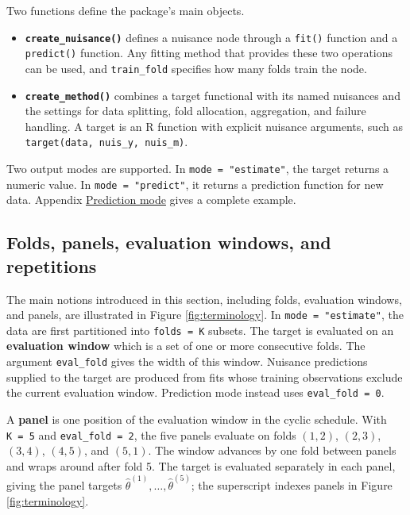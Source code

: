 Two functions define the package's main objects.

\begin{itemize}
\tightlist
\item
  \textbf{\texttt{create\_nuisance()}} defines a nuisance node through a \texttt{fit()} function and a \texttt{predict()} function. Any fitting method that provides these two operations can be used, and \texttt{train\_fold} specifies how many folds train the node.
\item
  \textbf{\texttt{create\_method()}} combines a target functional with its named nuisances and the settings for data splitting, fold allocation, aggregation, and failure handling. A target is an R function with explicit nuisance arguments, such as \texttt{target(data,\ nuis\_y,\ nuis\_m)}.
\end{itemize}

Two output modes are supported. In \texttt{mode\ =\ "estimate"}, the target returns a numeric value. In \texttt{mode\ =\ "predict"}, it returns a prediction function for new data. Appendix \hyperref[app:predict]{Prediction mode} gives a complete example.

\subsection{Folds, panels, evaluation windows, and repetitions}\label{subsec:schedule}

The main notions introduced in this section, including folds, evaluation windows, and panels, are illustrated in Figure \ref{fig:terminology}. In \texttt{mode\ =\ "estimate"}, the data are first partitioned into \texttt{folds\ =\ K} subsets. The target is evaluated on an \textbf{evaluation window} which is a set of one or more consecutive folds. The argument \texttt{eval\_fold} gives the width of this window. Nuisance predictions supplied to the target are produced from fits whose training observations exclude the current evaluation window. Prediction mode instead uses \texttt{eval\_fold\ =\ 0}.

A \textbf{panel} is one position of the evaluation window in the cyclic schedule. With \texttt{K\ =\ 5} and \texttt{eval\_fold\ =\ 2}, the five panels evaluate on folds \((1,2)\), \((2,3)\), \((3,4)\), \((4,5)\), and \((5,1)\). The window advances by one fold between panels and wraps around after fold 5. The target is evaluated separately in each panel, giving the panel targets \(\widehat{\theta}^{(1)},\ldots,\widehat{\theta}^{(5)}\); the superscript indexes panels in Figure \ref{fig:terminology}.


